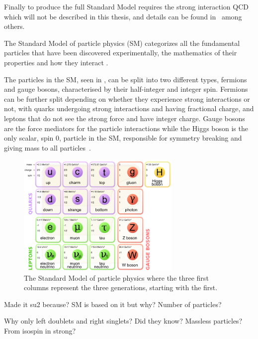 
Finally to produce the full Standard Model requires the strong interaction QCD which will not be described in this thesis, and details can be found in~\cite{13PDG} among others. 

The Standard Model of particle physics (SM) categorizes all the fundamental particles that have been discovered experimentally, the mathematics of their properties and how they interact \cite{32Burchan:1995, 38griffiths}. 

The particles in the SM, seen in , can be split into two different types, fermions and gauge bosons, characterised by their half-integer and integer spin. Fermions can be further split depending on whether they experience strong interactions or not, with quarks undergoing strong interactions and having fractional charge, and leptons that do not see the strong force and have integer charge. Gauge bosons are the force mediators for the particle interactions while the Higgs boson is the only scalar, spin 0, particle in the SM, responsible for symmetry breaking and giving mass to all particles~\cite{35Higgs}.


\begin{figure}[h!]
\includegraphics[width=0.7\textwidth]{figures/Standard_Model_of_Elementary_Particles.png}
\caption{The Standard Model of particle physics where the three first columns represent the three generations, starting with the first. \cite{33wiki1:Online}}
\label{fig:standardModel}
\end{figure}

Made it su2  because? SM is based on it but why? Number of particles?

Why only left doublets and right singlets? Did they know? Massless particles? From isospin in strong?


